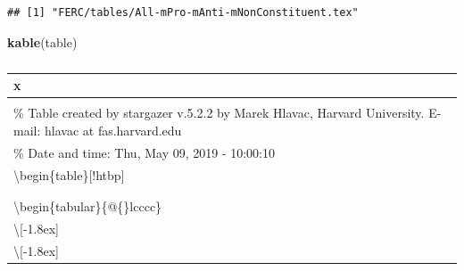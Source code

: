 \documentclass[]{article}
\newenvironment{Shaded}{\begin{snugshade}}{\end{snugshade}}
\newcommand{\KeywordTok}[1]{\textcolor[rgb]{0.13,0.29,0.53}{\textbf{#1}}}
\newcommand{\NormalTok}[1]{#1}
\begin{document}
\begin{verbatim}
## [1] "FERC/tables/All-mPro-mAnti-mNonConstituent.tex"
\end{verbatim}

\begin{Shaded}
\begin{Highlighting}[]
\KeywordTok{kable}\NormalTok{(table)}
\end{Highlighting}
\end{Shaded}

\begin{longtable}[]{@{}l@{}}
\toprule
\begin{minipage}[b]{0.97\columnwidth}\raggedright\strut
x\strut
\end{minipage}\tabularnewline
\midrule
\endhead
\begin{minipage}[t]{0.97\columnwidth}\raggedright\strut
\strut
\end{minipage}\tabularnewline
\begin{minipage}[t]{0.97\columnwidth}\raggedright\strut
\% Table created by stargazer v.5.2.2 by Marek Hlavac, Harvard
University. E-mail: hlavac at fas.harvard.edu\strut
\end{minipage}\tabularnewline
\begin{minipage}[t]{0.97\columnwidth}\raggedright\strut
\% Date and time: Thu, May 09, 2019 - 10:00:10\strut
\end{minipage}\tabularnewline
\begin{minipage}[t]{0.97\columnwidth}\raggedright\strut
\textbackslash{}begin\{table\}{[}!htbp{]} \centering\strut
\end{minipage}\tabularnewline
\begin{minipage}[t]{0.97\columnwidth}\raggedright\strut
\caption{}\strut
\end{minipage}\tabularnewline
\begin{minipage}[t]{0.97\columnwidth}\raggedright\strut
\label{}\strut
\end{minipage}\tabularnewline
\begin{minipage}[t]{0.97\columnwidth}\raggedright\strut
\textbackslash{}begin\{tabular\}\{@\{\extracolsep{5pt}\}lcccc\}\strut
\end{minipage}\tabularnewline
\begin{minipage}[t]{0.97\columnwidth}\raggedright\strut
\textbackslash{}{[}-1.8ex{]}\hline\strut
\end{minipage}\tabularnewline
\begin{minipage}[t]{0.97\columnwidth}\raggedright\strut
\hline \textbackslash{}{[}-1.8ex{]}\strut

\end{minipage}
\end{longtable}
\end{document}
